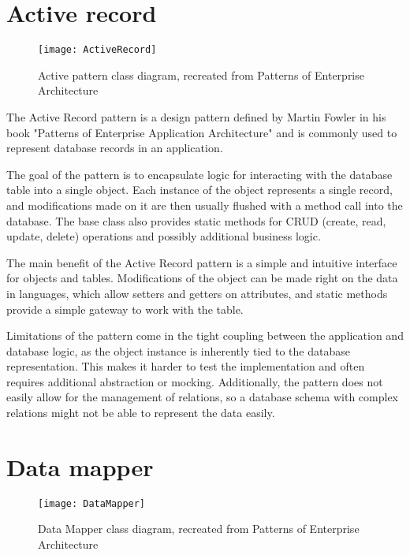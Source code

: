 \section*{Active record}

\begin{figure}[b]
    \caption{Active pattern class diagram, recreated from Patterns of Enterprise Architecture}
    \centering
    \texttt{[image: ActiveRecord]}
\end{figure}

The Active Record pattern is a design pattern defined by Martin Fowler in his
book "Patterns of Enterprise Application Architecture"
\cite[p. 160]{fowler-patterns-2003} and is commonly used to represent database
records in an application.

The goal of the pattern is to encapsulate logic for interacting with the
database table into a single object. Each instance of the object represents a
single record, and modifications made on it are then usually flushed with a
method call into the database. The base class also provides static methods for
CRUD (create, read, update, delete) operations and possibly additional business
logic.  

The main benefit of the Active Record pattern is a simple and intuitive
interface for objects and tables. Modifications of the object can be made right
on the data in languages, which allow setters and getters on attributes, and
static methods provide a simple gateway to work with the table. 

Limitations of the pattern come in the tight coupling between the application
and database logic, as the object instance is inherently tied to the database
representation. This makes it harder to test the implementation and often
requires additional abstraction or mocking. Additionally, the pattern does not
easily allow for the management of relations, so a database schema with complex
relations might not be able to represent the data easily. 

\section*{Data mapper}

\begin{figure}[b]
    \caption{Data Mapper class diagram, recreated from Patterns of Enterprise Architecture}
    \centering
    \texttt{[image: DataMapper]}
\end{figure}

